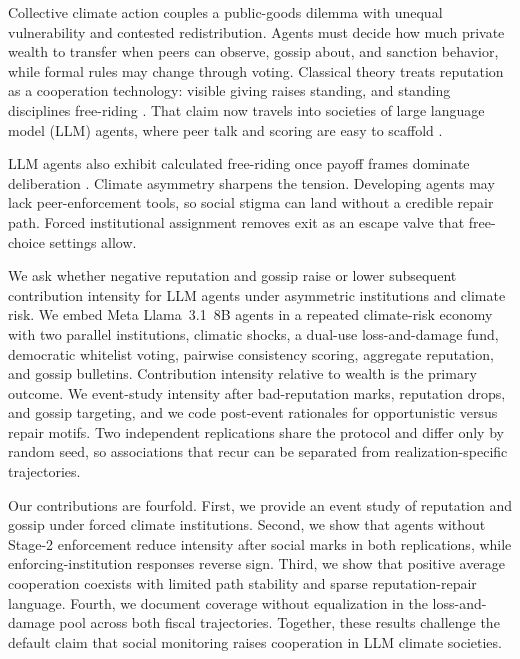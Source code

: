 Collective climate action couples a public-goods dilemma with unequal vulnerability and contested redistribution.
Agents must decide how much private wealth to transfer when peers can observe, gossip about, and sanction behavior, while formal rules may change through voting.
Classical theory treats reputation as a cooperation technology: visible giving raises standing, and standing disciplines free-riding .
That claim now travels into societies of large language model (LLM) agents, where peer talk and scoring are easy to scaffold .

LLM agents also exhibit calculated free-riding once payoff frames dominate deliberation .
Climate asymmetry sharpens the tension.
Developing agents may lack peer-enforcement tools, so social stigma can land without a credible repair path.
Forced institutional assignment removes exit as an escape valve that free-choice settings allow.

We ask whether negative reputation and gossip raise or lower subsequent contribution intensity for LLM agents under asymmetric institutions and climate risk.
We embed Meta Llama~3.1~8B agents in a repeated climate-risk economy with two parallel institutions, climatic shocks, a dual-use loss-and-damage fund, democratic whitelist voting, pairwise consistency scoring, aggregate reputation, and gossip bulletins.
Contribution intensity relative to wealth is the primary outcome.
We event-study intensity after bad-reputation marks, reputation drops, and gossip targeting, and we code post-event rationales for opportunistic versus repair motifs.
Two independent replications share the protocol and differ only by random seed, so associations that recur can be separated from realization-specific trajectories.

Our contributions are fourfold.
First, we provide an event study of reputation and gossip under forced climate institutions.
Second, we show that agents without Stage-2 enforcement reduce intensity after social marks in both replications, while enforcing-institution responses reverse sign.
Third, we show that positive average cooperation coexists with limited path stability and sparse reputation-repair language.
Fourth, we document coverage without equalization in the loss-and-damage pool across both fiscal trajectories.
Together, these results challenge the default claim that social monitoring raises cooperation in LLM climate societies.
